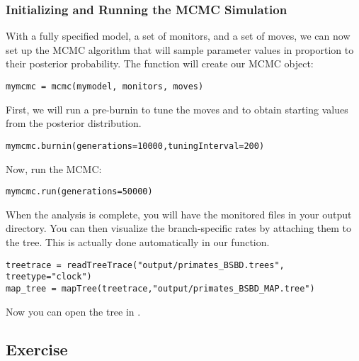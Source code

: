 \subsubsection{Initializing and Running the MCMC Simulation}

With a fully specified model, a set of monitors, and a set of moves, we can now set up the MCMC algorithm that will sample parameter values in proportion to their posterior probability. The  function will create our MCMC object:
{\tt \begin{snugshade*}
\begin{lstlisting}
mymcmc = mcmc(mymodel, monitors, moves)
\end{lstlisting}
\end{snugshade*}}

First, we will run a pre-burnin to tune the moves and to obtain starting values from the posterior distribution.
{\tt \begin{snugshade*}
\begin{lstlisting}
mymcmc.burnin(generations=10000,tuningInterval=200)
\end{lstlisting}
\end{snugshade*}}


Now, run the MCMC:
{\tt \begin{snugshade*}
\begin{lstlisting}
mymcmc.run(generations=50000)
\end{lstlisting}
\end{snugshade*}}

When the analysis is complete, you will have the monitored files in your output directory.
You can then visualize the branch-specific rates by attaching them to the tree.
This is actually done automatically in our  function.
{\tt \begin{snugshade*}
\begin{lstlisting}
treetrace = readTreeTrace("output/primates_BSBD.trees", treetype="clock")
map_tree = mapTree(treetrace,"output/primates_BSBD_MAP.tree")
\end{lstlisting}
\end{snugshade*}}
Now you can open the tree in \FigTree.




\subsection{Exercise}

